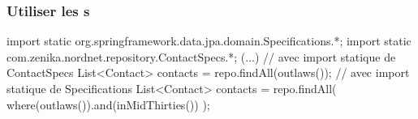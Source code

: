 \begin{frame}[fragile]
 \frametitle{Utiliser les s}

 \begin{javacode}
import static org.springframework.data.jpa.domain.Specifications.*;
import static com.zenika.nordnet.repository.ContactSpecs.*;
(...)
// avec import statique de ContactSpecs
List<Contact> contacts = repo.findAll(outlaws());
// avec import statique de Specifications
List<Contact> contacts = repo.findAll(
  where(outlaws()).and(inMidThirties())
);
 \end{javacode}

\end{frame}